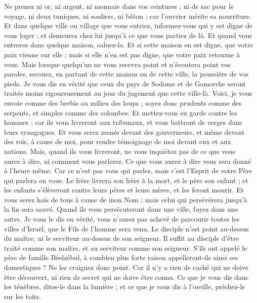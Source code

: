 \begin{multicols}{2}
Ne prenez ni or, ni argent, ni monnaie dans vos ceintures ;
ni de sac pour le voyage, ni deux tuniques, ni souliers, ni bâton ; car l'ouvrier mérite sa nourriture.
Et dans quelque ville ou village que vous entriez, informez-vous qui y est digne de vous loger ; et demeurez chez lui jusqu'à ce que vous partiez de là.
Et quand vous entrerez dans quelque maison, saluez-la.
Et si cette maison en est digne, que votre paix vienne sur elle ; mais si elle n'en est pas digne, que votre paix retourne à vous.
Mais lorsque quelqu'un ne vous recevra point et n'écoutera point vos paroles, secouez, en partant de cette maison ou de cette ville, la poussière de vos pieds.
Je vous dis en vérité que ceux du pays de Sodome et de Gomorrhe seront traités moins rigoureusement au jour du jugement que cette ville-là.
Voici, je vous envoie comme des brebis au milieu des loups ; soyez donc prudents comme des serpents, et simples comme des colombes.
Et mettez-vous en garde contre les hommes ; car ils vous livreront aux tribunaux, et vous battront de verges dans leurs synagogues.
Et vous serez menés devant des gouverneurs, et même devant des rois, à cause de moi, pour rendre témoignage de moi devant eux et aux nations.
Mais, quand ils vous livreront, ne vous inquiétez pas de ce que vous aurez à dire, ni comment vous parlerez. Ce que vous aurez à dire vous sera donné à l’heure même.
Car ce n'est pas vous qui parlez, mais c'est l'Esprit de votre Père qui parlera en vous.
Le frère livrera son frère à la mort, et le père son enfant ; et les enfants s'élèveront contre leurs pères et leurs mères, et les feront mourir.
Et vous serez haïs de tous à cause de mon Nom ; mais celui qui persévérera jusqu’à la fin sera sauvé.
Quand ils vous persécuteront dans une ville, fuyez dans une autre. Je vous le dis en vérité, vous n'aurez pas achevé de parcourir toutes les villes d'Israël, que le Fils de l'homme sera venu.
Le disciple n’est point au-dessus du maître, ni le serviteur au-dessus de son seigneur.
Il suffit au disciple d'être traité comme son maître, et au serviteur comme son seigneur. S’ils ont appelé le père de famille Béelzébul, à combien plus forte raison appelleront-ils ainsi ses domestiques ?
Ne les craignez donc point. Car il n'y a rien de caché qui ne doive être découvert, ni rien de secret qui ne doive être connu.
Ce que je vous dis dans les ténèbres, dites-le dans la lumière ; et ce que je vous dis à l'oreille, prêchez-le sur les toits.

\end{multicols}
